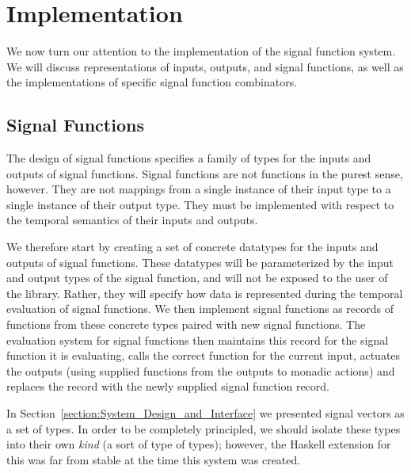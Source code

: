 \section{Implementation}
\label{section:Implementation}

We now turn our attention to the implementation of the signal function
system. We will discuss representations of inputs, outputs, and signal functions,
as well as the implementations of specific signal function combinators.

\subsection{Signal Functions}
\label{subsection:Implementation-Signal_Functions}

The design of signal functions specifies a family of types for the inputs and
outputs of signal functions. Signal functions are not functions in the purest
sense, however. They are not mappings from a single instance of their input
type to a single instance of their output type. They must be implemented with
respect to the temporal semantics of their inputs and outputs.

We therefore start by creating a set of concrete datatypes for the inputs and
outputs of signal functions. These datatypes will be parameterized by the input
and output types of the signal function, and will not be exposed to the user of
the library. Rather, they will specify how data is represented during the
temporal evaluation of signal functions. 
We then implement signal functions
as records of functions from these concrete types  paired
with new signal functions. The evaluation system for signal functions then
maintains this record for the signal function it is evaluating, calls the
correct function for the current input, actuates the outputs (using supplied
functions from the outputs to monadic actions) and replaces the record with the
newly supplied signal function record.

In Section~\ref{section:System_Design_and_Interface} we presented signal vectors
as a set of types. In order to be completely principled, we should isolate these
types into their own {\em kind} (a sort of type of types); however, the Haskell
extension for this was far from stable at the time this system was created.

